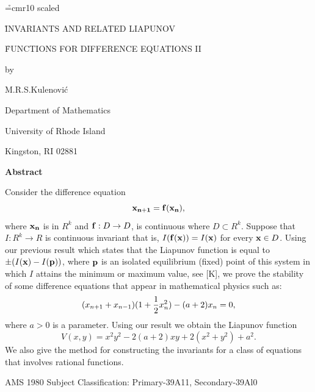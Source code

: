 
\vsize 18cm
\hsize 15.4cm
\item{}
\vskip 1cm
\font\r=cmr10 scaled

\centerline{\r INVARIANTS AND RELATED LIAPUNOV} 
\medskip
\centerline{\r FUNCTIONS FOR DIFFERENCE EQUATIONS II}

\bigskip 
\centerline{by}
\bigskip
\centerline{M.R.S.Kulenovi\'c}

\centerline{Department of Mathematics}

\centerline{University of Rhode Island}

\centerline{Kingston, RI 02881}

\vskip 1.5cm
\centerline{\bf Abstract}
\vskip 1.5cm
Consider the difference equation 
$${\bf x_{n+1}}={\bf f( x_n)},$$
where ${\bf x_n}$ is in $R^k$  and ${\bf f}: D\to D$, is continuous  
where $D \subset R^k$. 
Suppose that $I:R^k\to R$ is continuous invariant that is, $I({\bf f(x)})=I({\bf x})$ 
for every ${\bf x}\in D$. Using our previous result which states 
that the  Liapunov function is equal to  $\pm(I({\bf x}) - I({\bf p}))$, 
where ${\bf p}$ is an isolated  equilibrium (fixed) point  of this system in 
which $I$ attains the minimum or maximum value, see [K], we prove the stability of some 
difference equations that appear in mathematical physics such as: 
$$(x_{n+1} + x_{n-1})(1+{1\over 2}x_n^2) - (a+2)x_n=0,$$ 
where $a>0$ is a parameter. Using our result we obtain the Liapunov function 
$$V(x,y)=x^2y^2-2(a+2)xy+2(x^2+y^2)+a^2.$$
We also give the method for constructing the invariants for a class of 
equations that involves rational functions. 


\vskip 2cm

AMS 1980 Subject Classification: Primary-39A11, Secondary-39Al0


\vfill\eject
\vglue 2cm

